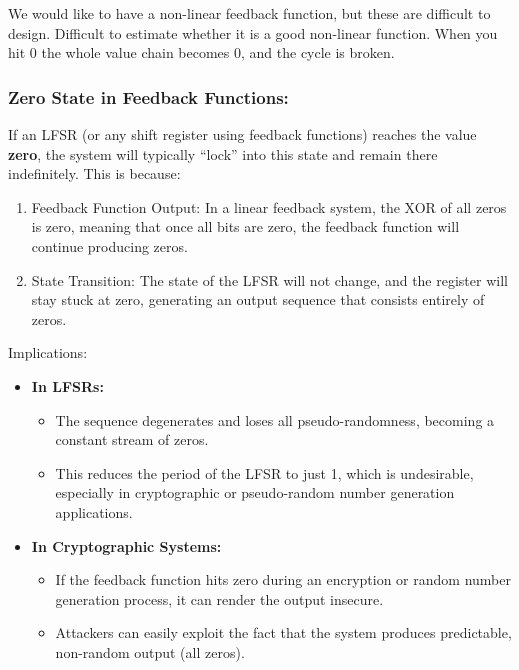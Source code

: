 We would like to have a non-linear feedback function, but these are difficult to design. Difficult to estimate whether it is a good non-linear function. When you hit 0 the whole value chain becomes 0, and the cycle is broken. \\

\subsubsection{Zero State in Feedback Functions:}
If an LFSR (or any shift register using feedback functions) reaches the value \textbf{zero}, the system will typically ``lock'' into this state and remain there indefinitely. This is because:

\begin{enumerate}
    \item Feedback Function Output: In a linear feedback system, the XOR of all zeros is zero, meaning that once all bits are zero, the feedback function will continue producing zeros.
    \item State Transition: The state of the LFSR will not change, and the register will stay stuck at zero, generating an output sequence that consists entirely of zeros.
\end{enumerate}

Implications:
\begin{itemize}
    \item \textbf{In LFSRs:}
    \begin{itemize}
        \item The sequence degenerates and loses all pseudo-randomness, becoming a constant stream of zeros.
        \item This reduces the period of the LFSR to just 1, which is undesirable, especially in cryptographic or pseudo-random number generation applications.
    \end{itemize}
    
    \item \textbf{In Cryptographic Systems:}
    \begin{itemize}
        \item If the feedback function hits zero during an encryption or random number generation process, it can render the output insecure.
        \item Attackers can easily exploit the fact that the system produces predictable, non-random output (all zeros).
    \end{itemize}
\end{itemize}

